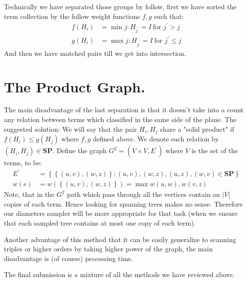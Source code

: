 \documentclass{article}
\begin{document}
\begin{multicols*}{2}
Technically we have separated those groups by follow, first we have sorted the term collection by the follow weight functions \(f,g\) such that:
\begin{equation*}
    \begin{split}
        f\left(H_{i}\right) &= \min {j : H_{j^{\prime}} = I \ \text{for } j^{\prime} > j } \\
        g\left(H_{i}\right) &= \max {j : H_{j^{\prime}} = I \ \text{for } j^{\prime} \le j }
    \end{split}
\end{equation*}    
And then we have matched pairs till we get into intersection.  
\section{The Product Graph.}
The main disadvantage of the last separation is that it doesn't take into a count any relation between terms which classified in the same side of the plane. The suggested solution: We will say that the pair \(H_i, H_j\) share a "solid product" if  \( f\left(H_{i}\right) \le g \left(H_{j}\right) \) where \(f,g\) defined above. We denote such relation by \(\left(H_i, H_j\right) \in \textbf{SP} \). Define the graph \(G^2 = \left(V\times V , E^{\prime}\right)\) where \(V\) is the set of the terms, to be: 
\begin{equation*}
    \begin{split}
        E^{\prime} &= \left\{ \left\{ (u,v),(w,z) \right\} : (u,v),(w,z),(u,z),(w,v) \in \textbf{SP} \right\}  \\
        w(e) &= w\left( \left\{ (u,v),(w,z) \right\} \right) = \max { w(u,w),w(v,z) }
    \end{split}
\end{equation*}
Note, that in the \(G^2\) path which pass through all the vertices contain an \(|V|\) copies of each term. Hence looking for spanning trees makes no sense. Therefore our diameters sampler will be more appropriate for that task (when we ensure that each sampled tree contains at most one copy of each term).          

Another advantage of this method that it can be easily generalize to scanning triples or higher orders by taking higher power of the graph, the main disadvantage is (of course) processing time.       

The final submission is a mixture of all the methods we have reviewed above.   

\end{multicols*}
\end{document}
